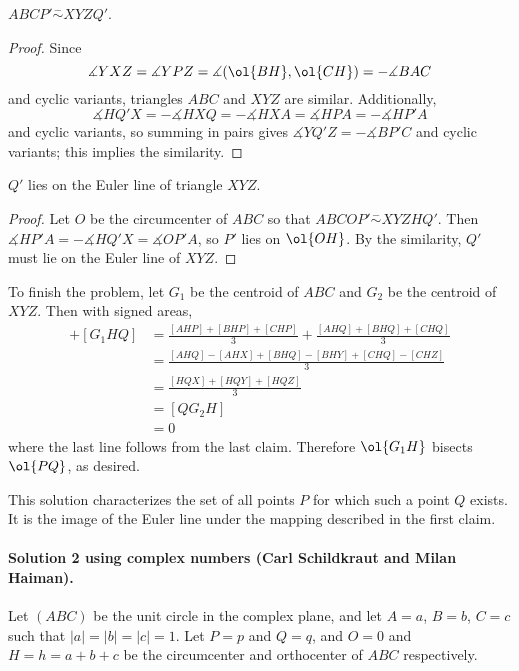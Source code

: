 \documentclass[11pt]{scrartcl}
\begin{document}
\begin{claim*}
  $ABCP' \stackrel{-}{\sim} XYZQ'$.
\end{claim*}

\begin{proof}
    Since
    \[\measuredangle YXZ = \measuredangle YPZ = \measuredangle(\ol{BH},
    \ol{CH}) = -\measuredangle BAC\]
    and cyclic variants, triangles $ABC$ and $XYZ$ are similar. Additionally,
    \[\measuredangle HQ'X = -\measuredangle HXQ = -\measuredangle HXA =
    \measuredangle HPA = -\measuredangle HP'A\]
    and cyclic variants, so summing in pairs gives $\measuredangle YQ'Z =
    -\measuredangle BP'C$ and cyclic variants; this implies the similarity.
\end{proof}

\begin{claim*}
    $Q'$ lies on the Euler line of triangle $XYZ$.
\end{claim*}

\begin{proof}
  Let $O$ be the circumcenter of $ABC$ so that $ABCOP' \stackrel{-}{\sim} XYZHQ'$. Then
    $\measuredangle HP'A = -\measuredangle HQ'X = \measuredangle OP'A$, so $P'$ lies on
    $\ol{OH}$. By the similarity, $Q'$ must lie on the Euler line of $XYZ$.
\end{proof}

To finish the problem, let $G_1$ be the centroid of $ABC$ and $G_2$ be the
centroid of $XYZ$. Then with signed areas,
\begin{align*}
    [G_1HP] + [G_1HQ] &= \frac{[AHP] + [BHP] + [CHP]}{3} + \frac{[AHQ] + [BHQ] + [CHQ]}{3} \\
    &= \frac{[AHQ] - [AHX] + [BHQ] - [BHY] + [CHQ] - [CHZ]}{3} \\
    &= \frac{[HQX] + [HQY] + [HQZ]}{3} \\
    &= [QG_2H] \\
    &= 0
\end{align*}
where the last line follows from the last claim. Therefore $\ol{G_1H}$
bisects $\ol{PQ}$, as desired.

\begin{remark*}
  This solution characterizes the set of all points $P$ for which such a point
  $Q$ exists. It is the image of the Euler line under the mapping described in
  the first claim.
\end{remark*}

\paragraph{Solution 2 using complex numbers (Carl Schildkraut and Milan Haiman).}
Let $(ABC)$ be the unit circle in the complex plane, and let $A=a$, $B=b$, $C=c$
such that $|a|=|b|=|c|=1$. Let $P=p$ and $Q=q$, and $O=0$ and $H=h=a+b+c$ be the
circumcenter and orthocenter of $ABC$ respectively.
\end{document}
